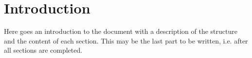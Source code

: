 \section{Introduction}
\label{sec:Introduction}


Here goes an introduction to the document with a description of the structure and the content of each section. This may be the last part to be written, i.e. after all sections are completed.

